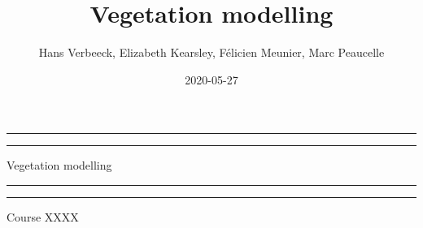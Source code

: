 \documentclass[]{book}
\title{Vegetation modelling}
\author{Hans Verbeeck, Elizabeth Kearsley, Félicien Meunier, Marc Peaucelle}
\date{2020-05-27}
\begin{document}
\maketitle

\newcommand{\plogo}{\fbox{$\mathcal{PL}$}} %



\begin{titlepage} %

	\centering %
	
	\scshape %
	
	\vspace*{\baselineskip} %
	
	
	\vspace{8\baselineskip}
	
	\rule{\textwidth}{1.6pt}\vspace*{-\baselineskip}\vspace*{2pt} %
	\rule{\textwidth}{0.4pt} %
	
	\vspace{0.75\baselineskip} %
	
	{\LARGE Vegetation modelling\\} %
	
	\vspace{0.75\baselineskip} %
	
	\rule{\textwidth}{0.4pt}\vspace*{-\baselineskip}\vspace{3.2pt} %
	\rule{\textwidth}{1.6pt} %
	
	\vspace{2\baselineskip} %
	
	
	Course XXXX %
	
	\vspace*{3\baselineskip} %
	
	

\end{titlepage}
\end{document}
